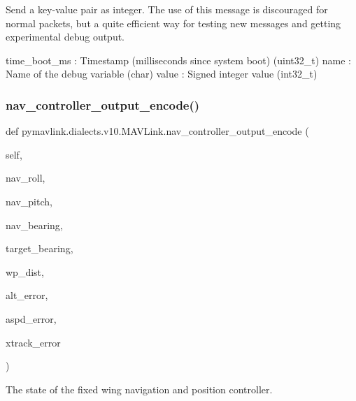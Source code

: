 \begin{DoxyVerb}
\begin{DoxyVerb}
\begin{DoxyVerb}
\begin{DoxyVerb}
\begin{DoxyVerb}Send a key-value pair as integer. The use of this message is
discouraged for normal packets, but a quite efficient
way for testing new messages and getting experimental
debug output.

time_boot_ms              : Timestamp (milliseconds since system boot) (uint32_t)
name                      : Name of the debug variable (char)
value                     : Signed integer value (int32_t)\end{DoxyVerb}
 \mbox{\label{classpymavlink_1_1dialects_1_1v10_1_1MAVLink_a4f3119f89035afb45834e41bb4e97378}} 
\subsubsection{\texorpdfstring{nav\+\_\+controller\+\_\+output\+\_\+encode()}{nav\_controller\_output\_encode()}}
{\footnotesize\ttfamily def pymavlink.\+dialects.\+v10.\+M\+A\+V\+Link.\+nav\+\_\+controller\+\_\+output\+\_\+encode (\begin{DoxyParamCaption}\item[{}]{self,  }\item[{}]{nav\+\_\+roll,  }\item[{}]{nav\+\_\+pitch,  }\item[{}]{nav\+\_\+bearing,  }\item[{}]{target\+\_\+bearing,  }\item[{}]{wp\+\_\+dist,  }\item[{}]{alt\+\_\+error,  }\item[{}]{aspd\+\_\+error,  }\item[{}]{xtrack\+\_\+error }\end{DoxyParamCaption})}

\begin{DoxyVerb}The state of the fixed wing navigation and position controller.


\end{DoxyVerb}
\end{DoxyVerb}
\end{DoxyVerb}
\end{DoxyVerb}
\end{DoxyVerb}
